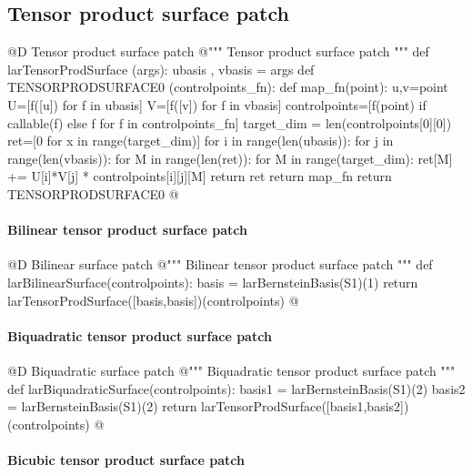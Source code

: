 \documentclass[11pt,oneside]{article}	%
\begin{document}
\subsection{Tensor product surface patch}

@D Tensor product surface patch
@{""" Tensor product surface patch """
def larTensorProdSurface (args):
	ubasis , vbasis = args
	def TENSORPRODSURFACE0 (controlpoints_fn):
		def map_fn(point):
			u,v=point
			U=[f([u]) for f in ubasis]
			V=[f([v]) for f in vbasis]
			controlpoints=[f(point) if callable(f) else f 
				for f in controlpoints_fn]
			target_dim = len(controlpoints[0][0])
			ret=[0 for x in range(target_dim)]
			for i in range(len(ubasis)):
				for j in range(len(vbasis)):
					for M in range(len(ret)):
						for M in range(target_dim): 
							ret[M] += U[i]*V[j] * controlpoints[i][j][M]
			return ret
		return map_fn
	return TENSORPRODSURFACE0
@}

\paragraph{Bilinear tensor product surface patch}

@D Bilinear surface patch
@{""" Bilinear tensor product surface patch """
def larBilinearSurface(controlpoints):
	basis = larBernsteinBasis(S1)(1)
	return larTensorProdSurface([basis,basis])(controlpoints)
@}

\paragraph{Biquadratic tensor product surface patch}

@D Biquadratic surface patch
@{""" Biquadratic tensor product surface patch """
def larBiquadraticSurface(controlpoints):
	basis1 = larBernsteinBasis(S1)(2)
	basis2 = larBernsteinBasis(S1)(2)
	return larTensorProdSurface([basis1,basis2])(controlpoints)
@}

\paragraph{Bicubic tensor product surface patch}
\end{document}
